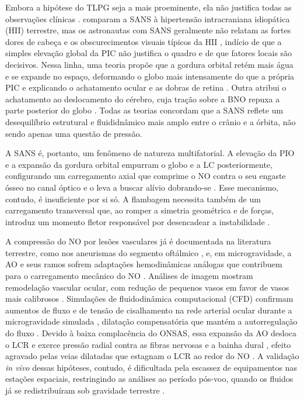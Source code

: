 \documentclass[article, hidelinks,oneside,12pt]{abntex2}
\begin{document}
Embora a hipótese do TLPG seja a mais proeminente, ela não justifica todas as observações clínicas \cite{yang2022}.  comparam a SANS à hipertensão intracraniana idiopática (HII) terrestre, mas os astronautas com SANS geralmente não relatam as fortes dores de cabeça e os obscurecimentos visuais típicos da HII \cite{zhang2025}, indício de que a simples elevação global da PIC não justifica o quadro e de que fatores locais são decisivos. Nessa linha, uma teoria propõe que a gordura orbital retém mais água e se expande no espaço, deformando o globo mais intensamente do que a própria PIC e explicando o achatamento ocular e as dobras de retina \cite{reilly2023}. Outra atribui o achatamento ao deslocamento do cérebro, cuja tração sobre a BNO repuxa a parte posterior do globo \cite{carter2023}. Todas as teorias concordam que a SANS reflete um desequilíbrio estrutural e fluididnâmico mais amplo entre o crânio e a órbita, não sendo apenas uma questão de pressão.

A SANS é, portanto, um fenômeno de natureza multifatorial. A elevação da PIO e a expansão da gordura orbital empurram o globo e a LC posteriormente, configurando um carregamento axial que comprime o NO contra o seu engaste ósseo no canal óptico e o leva a buscar alívio dobrando-se \cite{reilly2023, sigal2004, newson2006, islam2024}. Esse mecanismo, contudo, é insuficiente por si só. A flambagem necessita também de um carregamento transversal que, ao romper a simetria geométrica e de forças, introduz um momento fletor responsável por desencadear a instabilidade \cite{jafari2025, lim2024, chiang2025, wang2016}.

A compressão do NO por lesões vasculares já é documentada na literatura terrestre, como nos aneurismas do segmento oftálmico \cite{fujita, beatty, date}, e, em microgravidade, a AO e seus ramos sofrem adaptações hemodinâmicas análogas que contribuem para o carregamento mecânico do NO \cite{salerni2019, nigro2026}. Análises de imagem mostram remodelação vascular ocular, com redução de pequenos vasos em favor de vasos mais calibrosos \cite{vyas}. Simulações de fluidodinâmica computacional (CFD) confirmam aumentos de fluxo e de tensão de cisalhamento na rede arterial ocular durante a microgravidade simulada \cite{caddy2024}, dilatação compensatória que mantém a autorregulação do fluxo \cite{salerni2019, nigro2026}. Devido à baixa complacência do ONSAS, essa expansão da AO desloca o LCR e exerce pressão radial contra as fibras nervosas e a bainha dural \cite{nigro2026}, efeito agravado pelas veias dilatadas que estagnam o LCR ao redor do NO \cite{yang2022}. A validação \textit{in vivo} dessas hipóteses, contudo, é dificultada pela escassez de equipamentos nas estações espaciais, restringindo as análises ao período pós-voo, quando os fluidos já se redistribuíram sob gravidade terrestre \cite{lee2018, mader2013, wahlin2021, rohr}.
\end{document}
